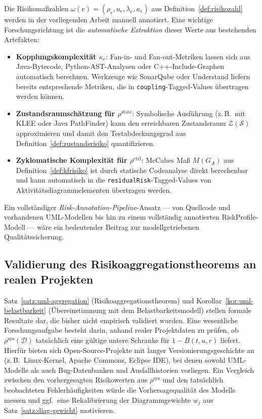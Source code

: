﻿\documentclass[a4paper,12pt]{article}
\theoremstyle{definition}
\begin{document}
Die Risikoma\ss{}zahlen $\omega(e) = (\rho_e, u_e, \lambda_e, \kappa_e)$ aus
Definition~\ref{def:risikozahl} werden in der vorliegenden Arbeit manuell annotiert.
Eine wichtige Forschungsrichtung ist die \emph{automatische Extraktion} dieser Werte
aus bestehenden Artefakten:

\begin{itemize}
    \item \textbf{Kopplungskomplexit\"at $\kappa_e$}: Fan-in- und Fan-out-Metriken
          lassen sich aus Java-Bytecode, Python-AST-Analysen oder C++-Include-Graphen
          automatisch berechnen. Werkzeuge wie SonarQube oder Understand liefern
          bereits entsprechende Metriken, die in \texttt{coupling}-Tagged-Values
          \"ubertragen werden k\"onnen.
    \item \textbf{Zustandsraumsch\"atzung f\"ur $\rho^{\mathrm{state}}$}: Symbolische
          Ausf\"uhrung (z.\,B.\ mit KLEE oder Java PathFinder) kann den erreichbaren
          Zustandsraum $\mathcal{Z}(\mathcal{S})$ approximieren und damit den
          Testabdeckungsgrad aus Definition~\ref{def:zustandsrisiko} quantifizieren.
    \item \textbf{Zyklomatische Komplexit\"at f\"ur $\rho^{\mathrm{ctrl}}$}: McCabes
          Ma\ss{} $M(G_A)$ aus Definition~\ref{def:kfrisiko} ist durch statische
          Codeanalyse direkt berechenbar und kann automatisch in die
          \texttt{residualRisk}-Tagged-Values von Aktivit\"atsdiagrammelementen
          \"ubertragen werden.
\end{itemize}

Ein vollst\"andiger \emph{Risk-Annotation-Pipeline}-Ansatz --- von Quellcode und
vorhandenen UML-Modellen bis hin zu einem vollst\"andig annotierten
\textsf{RiskProfile}-Modell --- w\"are ein bedeutender Beitrag zur
modellgetriebenen Qualit\"atssicherung.

\subsection{Validierung des Risikoaggregationstheorems an realen Projekten}

Satz~\ref{satz:uml-aggregation} (Risikoaggregationstheorem) und
Korollar~\ref{kor:uml-belastbarkeit} (\"Ubereinstimmung mit dem Belastbarkeitsmodell)
stellen formale Resultate dar, die bisher nicht empirisch validiert wurden. Eine
wesentliche Forschungsaufgabe besteht darin, anhand realer Projektdaten zu pr\"ufen,
ob $\rho^{\mathrm{sys}}(\mathcal{D})$ tats\"achlich eine g\"ultige untere Schranke
f\"ur $1 - B(t, u, r)$ liefert. Hierf\"ur bieten sich Open-Source-Projekte mit
langer Versionierungsgeschichte an (z.\,B.\ Linux-Kernel, Apache Commons, Eclipse
IDE), bei denen sowohl UML-Modelle als auch Bug-Datenbanken und Ausfallhistorien
vorliegen. Ein Vergleich zwischen den vorhergesagten Risikowerten aus
$\rho^{\mathrm{sys}}$ und den tats\"achlich beobachteten Fehlerh\"aufigkeiten w\"urde
die Vorhersagequalit\"at des Modells messen und ggf.\ eine Rekalibrierung der
Diagrammgewichte $w_j$ aus Satz~\ref{satz:diag-gewicht} motivieren.
\end{document}

